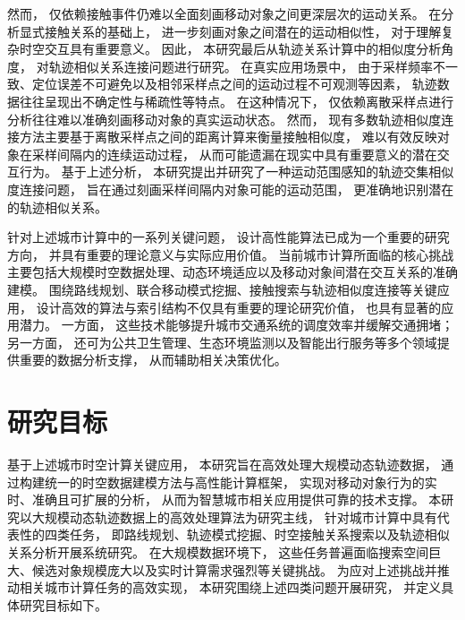 然而， 仅依赖接触事件仍难以全面刻画移动对象之间更深层次的运动关系。 在分析显式接触关系的基础上， 进一步刻画对象之间潜在的运动相似性， 对于理解复杂时空交互具有重要意义。 因此， 本研究最后从轨迹关系计算中的相似度分析角度， 对轨迹相似关系连接问题进行研究。 在真实应用场景中， 由于采样频率不一致、定位误差不可避免以及相邻采样点之间的运动过程不可观测等因素， 轨迹数据往往呈现出不确定性与稀疏性等特点。 在这种情况下， 仅依赖离散采样点进行分析往往难以准确刻画移动对象的真实运动状态。 然而， 现有多数轨迹相似度连接方法主要基于离散采样点之间的距离计算来衡量接触相似度， 难以有效反映对象在采样间隔内的连续运动过程， 从而可能遗漏在现实中具有重要意义的潜在交互行为。 基于上述分析， 本研究提出并研究了一种运动范围感知的轨迹交集相似度连接问题， 旨在通过刻画采样间隔内对象可能的运动范围， 更准确地识别潜在的轨迹相似关系。



针对上述城市计算中的一系列关键问题， 设计高性能算法已成为一个重要的研究方向， 并具有重要的理论意义与实际应用价值。 当前城市计算所面临的核心挑战主要包括大规模时空数据处理、动态环境适应以及移动对象间潜在交互关系的准确建模。 围绕路线规划、联合移动模式挖掘、接触搜索与轨迹相似度连接等关键应用， 设计高效的算法与索引结构不仅具有重要的理论研究价值， 也具有显著的应用潜力。 一方面， 这些技术能够提升城市交通系统的调度效率并缓解交通拥堵；另一方面， 还可为公共卫生管理、生态环境监测以及智能出行服务等多个领域提供重要的数据分析支撑， 从而辅助相关决策优化。




\section{研究目标}
基于上述城市时空计算关键应用， 本研究旨在高效处理大规模动态轨迹数据， 通过构建统一的时空数据建模方法与高性能计算框架， 实现对移动对象行为的实时、准确且可扩展的分析， 从而为智慧城市相关应用提供可靠的技术支撑。 本研究以大规模动态轨迹数据上的高效处理算法为研究主线， 针对城市计算中具有代表性的四类任务， 即路线规划、轨迹模式挖掘、时空接触关系搜索以及轨迹相似关系分析开展系统研究。 在大规模数据环境下， 这些任务普遍面临搜索空间巨大、候选对象规模庞大以及实时计算需求强烈等关键挑战。 为应对上述挑战并推动相关城市计算任务的高效实现， 本研究围绕上述四类问题开展研究， 并定义具体研究目标如下。

